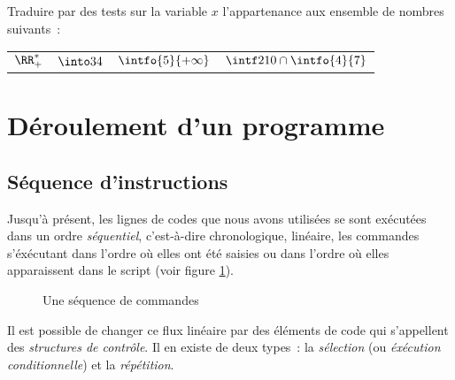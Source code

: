 \begin{exercice}
Traduire par des tests sur la variable $x$ l'appartenance aux ensemble de nombres suivants~:

\tabulinesep=1.5mm
\begin{tabu}to0.95
$\RR^*_+$ & $\into34$ & $\intfo{5}{+\infty}$ & $\intf2{10}\cap\intfo{4}{7}$
\end{tabu}
\end{exercice}

\section{Déroulement d'un programme}

\subsection{Séquence d'instructions}

Jusqu'à présent, les lignes de codes que nous avons utilisées se sont exécutées dans un ordre
\textit{séquentiel}, c'est-à-dire chronologique, linéaire, les commandes s'éxécutant dans l'ordre
où elles ont été saisies ou dans l'ordre où elles apparaissent dans le script
(voir figure \ref{python:conditions:figures:sequence}).

\begin{figure}[h]
\caption{Une séquence de commandes}\label{python:conditions:figures:sequence}
\centering
{}
\end{figure}


Il est possible de changer ce flux linéaire par des éléments de code qui s'appellent des
\textit{structures de contrôle}. Il en existe de deux types~: la \textit{sélection}
(ou \textit{éxécution conditionnelle}) et la \textit{répétition}.


